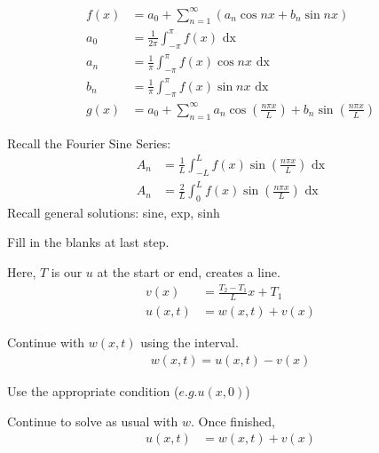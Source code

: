 \begin{align*}
  f(x) & =
  a_0 +
  \sum^\infty_{n = 1}
  (a_n \cos nx + b_n \sin nx)\\
  a_0 & =
  \frac{1}{2 \pi}
  \int^\pi_{-\pi}
  f(x)
  \text{ dx}\\
  a_n & =
  \frac{1}{\pi}
  \int^\pi_{-\pi}
  f(x) \cos nx
  \text{ dx}\\
  b_n & =
  \frac{1}{\pi}
  \int^\pi_{-\pi}
  f(x) \sin nx
  \text{ dx}\\
  g(x) & = a_0 + \sum^\infty_{n = 1}
  a_n \cos \left( \frac{n \pi x}{L} \right) +
  b_n \sin \left( \frac{n \pi x}{L} \right)
\end{align*}

Recall the Fourier Sine Series:
\begin{align*}
A_n & = \frac{1}{L}\int^L_{-L} f(x) \sin\left(\frac{n \pi x}{L}\right)\text{ dx}\\
A_n & = \frac{2}{L}\int^L_0 f(x) \sin\left(\frac{n \pi x}{L}\right)\text{ dx}
\end{align*}
Recall general solutions: sine, exp, sinh

Fill in the blanks at last step.


Here, $T$ is our $u$ at the start or end, creates a line.
\begin{align*}
v(x) & = \frac{T_2 - T_1}{L}x + T_1\\
u(x, t) & = w(x, t) + v(x)
\end{align*}

Continue with $w(x, t)$ using the interval.
\begin{align*}
w(x, t) = u(x, t) - v(x)
\end{align*}

Use the appropriate condition ($e.g. u(x, 0)$)

Continue to solve as usual with $w$. Once finished,
\begin{align*}
u(x, t) & = w(x, t) + v(x)
\end{align*}

